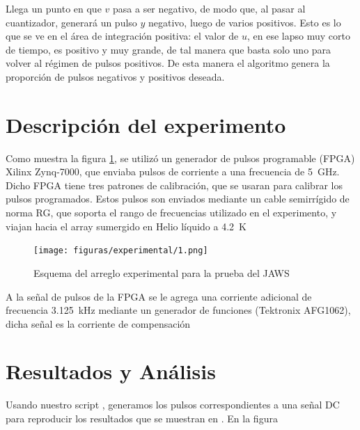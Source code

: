\documentclass[twoside]{article}
\begin{document}
\begin{multicols}{2}
Llega un punto en que $v$ pasa a ser negativo, de modo que, al pasar al cuantizador, generará un pulso $y$ negativo, luego de varios positivos. Esto es lo que se ve en el área de integración positiva: el valor de $u$, en ese lapso muy corto de tiempo, es positivo y muy grande, de tal manera que basta solo uno para volver al régimen de pulsos positivos. De esta manera el algoritmo genera la proporción de pulsos negativos y positivos deseada.

\section{Descripción del experimento}

Como muestra la figura \ref{fig:experimental_1}, se utilizó un generador de pulsos programable (FPGA) Xilinx Zynq-7000, que enviaba pulsos de corriente a una frecuencia de \SI{5}{\giga\hertz}. Dicho FPGA tiene tres patrones de calibración, que se usaran para calibrar los pulsos programados. Estos pulsos son enviados mediante un cable semirrígido de norma RG{}, que soporta el rango de frecuencias utilizado en el experimento, y viajan hacia el array sumergido en Helio líquido a \SI{4.2}{\kelvin}

\begin{figure}[H]
    \centering
    \texttt{[image: figuras/experimental/1.png]}
    \caption{Esquema del arreglo experimental para la prueba del JAWS}
    \label{fig:experimental_1}
    \end{figure}

A la señal de pulsos de la FPGA se le agrega una corriente adicional de frecuencia \SI{3.125}{\kilo\hertz} mediante un generador de funciones (Tektronix AFG1062), dicha señal es la corriente de compensación

\section{Resultados y Análisis}

Usando nuestro script \cite{script}, generamos los pulsos correspondientes a una señal DC para reproducir los resultados que se muestran en \cite{aziz1996}. En la figura 

\end{multicols}





\nocite{*} %
\end{document}

